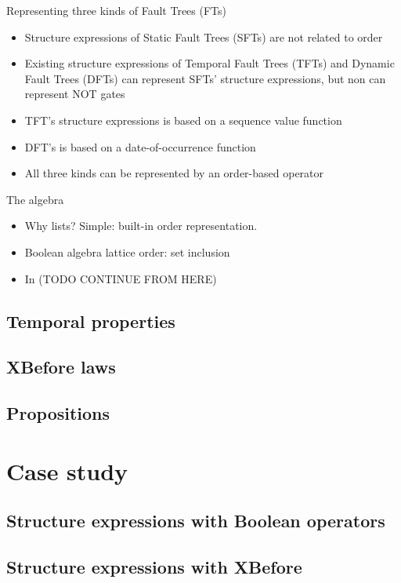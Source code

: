 \documentclass{beamer}
\def\FT{%
	Fault Tree (FT)%
	\gdef\FT{FT\xspace}%
	\gdef\FTs{FTs\xspace}%
	\gdef\IFT{An FT\xspace}%
	\xspace%
}
\def\FTs{%
	Fault Trees (FTs)%
	\gdef\FT{FT\xspace}%
	\gdef\FTs{FTs\xspace}%
	\gdef\IFT{An FT\xspace}%
	\xspace%
}
\def\IFT{%
	A Fault Tree (FT)%
	\gdef\FT{FT\xspace}%
	\gdef\FTs{FTs\xspace}%
	\gdef\IFT{An FT\xspace}%
	\xspace%
}
\def\SFT{%
	Static Fault Tree (SFT)%
	\gdef\SFT{SFT\xspace}%
	\gdef\SFTs{SFTs\xspace}%
	\xspace%
}
\def\SFTs{%
	Static Fault Trees (SFTs)%
	\gdef\SFT{SFT\xspace}%
	\gdef\SFTs{SFTs\xspace}%
	\xspace%
}
\def\TFT{%
	Temporal Fault Tree (TFT)%
	\gdef\TFT{TFT\xspace}%
	\gdef\TFTs{TFTs\xspace}%
	\xspace%
}
\def\TFTs{%
	Temporal Fault Trees (TFTs)%
	\gdef\TFT{TFT\xspace}%
	\gdef\TFTs{TFTs\xspace}%
	\xspace%
}
\def\DFT{%
	Dynamic Fault Tree (DFT)%
	\gdef\DFT{DFT\xspace}%
	\gdef\DFTs{DFTs\xspace}%
	\xspace%
}
\def\DFTs{%
	Dynamic Fault Trees (DFTs)%
	\gdef\DFT{DFT\xspace}%
	\gdef\DFTs{DFTs\xspace}%
	\xspace%
}
\begin{document}
\begin{frame}{Representing three kinds of \FTs}
	\begin{itemize}
		\item Structure expressions of \SFTs are not related to order
		\item Existing structure expressions of \TFTs and \DFTs can represent \SFTs' structure expressions, but non can represent NOT gates
		\item \TFT's structure expressions is based on a sequence value function
		\item \DFT's is based on a date-of-occurrence function
		\item All three kinds can be represented by an order-based operator
	\end{itemize}
\end{frame}

\begin{frame}{The algebra}
	\begin{itemize}
		\item Why lists? Simple: built-in order representation.
		\item Boolean algebra lattice order: set inclusion
		\item In (TODO CONTINUE FROM HERE)
	\end{itemize}
\end{frame}

\subsection{Temporal properties}
\subsection{XBefore laws}
\subsection{Propositions}

\section{Case study}
\subsection{Structure expressions with Boolean operators}
\subsection{Structure expressions with XBefore}
\end{document}
